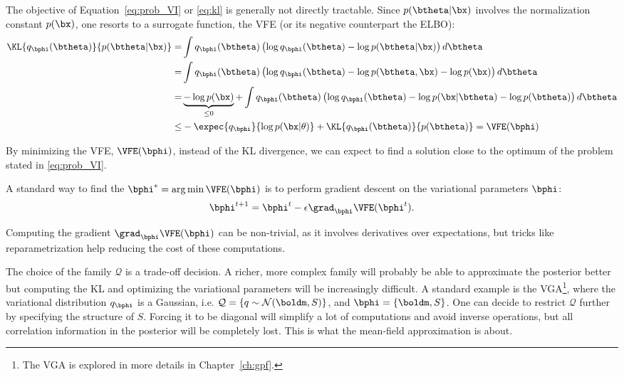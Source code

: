 The objective of Equation~\eqref{eq:prob_VI} or \eqref{eq:kl} is generally not directly tractable.
Since $p(\btheta|\bx)$ involves the normalization constant $p(\bx)$, one resorts to a surrogate function, the \ac{VFE} (or its negative counterpart the \ac{ELBO}):
\begin{align}
\KL{q_{\bphi}(\btheta)}{p(\btheta|\bx)} =& \int q_{\bphi}(\btheta) \left(\log q_{\bphi}(\btheta) - \log p(\btheta|\bx)\right)d\btheta\\
=&\int q_{\bphi}(\btheta) \left(\log q_{\bphi}(\btheta) - \log p(\btheta, \bx) - \log p(\bx)\right)d\btheta\\
=&\underbrace{- \log p(\bx)}_{\leq 0} + \int q_{\bphi}(\btheta) \left(\log q_{\bphi}(\btheta) - \log p(\bx|\btheta)- \log p(\btheta) \right)d\btheta\\
\leq& -\expec{q_{\bphi}}{\log p(\bx|\theta)} + \KL{q_{\bphi}(\btheta)}{p(\btheta)} = \VFE(\bphi)
\end{align}


By minimizing the \ac{VFE}, $\VFE(\bphi)$, instead of the \ac{KL} divergence, we can expect to find a solution close to the optimum of the problem stated in \eqref{eq:prob_VI}.

A standard way to find the $\bphi^* = \arg\min \VFE(\bphi)$ is to perform gradient descent on the variational parameters $\bphi$:
\begin{align}
\bphi^{t+1} = \bphi^{t} - \epsilon \grad_{\bphi}\VFE(\bphi^{t}).
\label{eq:vigraddescent}
\end{align}

Computing the gradient $\grad_{\bphi}\VFE(\bphi)$ can be non-trivial, as it involves derivatives over expectations, but tricks like reparametrization \cite{titsiasDoublyStochasticVariational} help reducing the cost of these computations.

The choice of the family $\mathcal{Q}$ is a trade-off decision.
A richer, more complex family will probably be able to approximate the posterior better but computing the \ac{KL} and optimizing the variational parameters will be increasingly difficult.
A standard example is the \ac{VGA}\footnote{The \ac{VGA} is explored in more details in Chapter~\ref{ch:gpf}.}, where the variational distribution $q_{\bphi}$ is a Gaussian, i.e. $\mathcal{Q} = \left\{q \sim \mathcal{N}(\boldm, S)\right\}$, and $\bphi = \{\boldm, S\}$.
One can decide to restrict $\mathcal{Q}$ further by specifying the structure of $S$.
Forcing it to be diagonal will simplify a lot of computations and avoid inverse operations, but all correlation information in the posterior will be completely lost.
This is what the mean-field approximation is about.

